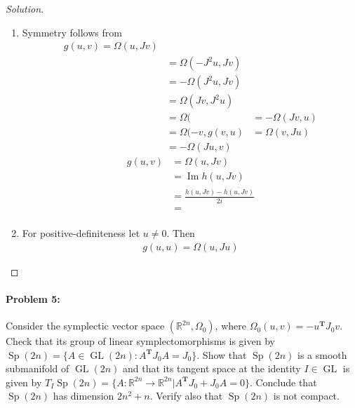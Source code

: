 \begin{proof}[Solution]
\begin{enumerate}
		\item Symmetry follows from
			 \begin{align*}
				g(u,v)=\Omega(u,Jv)\\
				&=\Omega(-J^{2} u,Jv)\\
				& =-\Omega(J^{2} u,Jv)\\
				& =\Omega(Jv,J^{2} u)\\
				&=\Omega(
				&=-\Omega(Jv,u)\\
				&=\Omega(-v,
				g(v,u)&=\Omega(v,Ju)\\
				&=-\Omega(Ju,v)
			\end{align*}
			\begin{align*}
				g(u,v)& =\Omega(u,Jv)\\
				& =\operatorname{Im}h(u,Jv)\\
				&=\frac{h(u,Jv)-\overline{h(u,Jv)}}{2i}\\
				&=\frac{}{}

			\end{align*}

		\item For positive-definiteness let $u\neq 0$. Then
			\begin{align*}
				g(u,u)=\Omega(u,Ju)
			\end{align*}
	\end{enumerate}

\end{proof}

 \paragraph{Problem 5:} Consider the symplectic vector space $(\mathbb{R}^{2n},\Omega_0)$, where $\Omega_0(u,v)=-u^{\mathbf{T}} J_0v$. Check that its group of linear symplectomorphisms is given by $\operatorname{Sp}(2n)=\{A\in \operatorname{GL}(2n):A^{\mathbf{T}}J_0A=J_0\}.$ Show that $\operatorname{Sp}(2n)$ is a smooth submanifold of $\operatorname{GL}(2n)$ and that its tangent space at the identity $I\in \operatorname{GL}$ is given by $T_{I}\operatorname{Sp}(2n)=\{A:\mathbb{R}^{2n}\to \mathbb{R}^{2n}|A^{\mathbf{T}} J_0+J_0A=0\} $. Conclude that $\operatorname{Sp}(2n)$ has dimension $2n^{2} +n$. Verify also that $\operatorname{Sp}(2n)$ is not compact.

